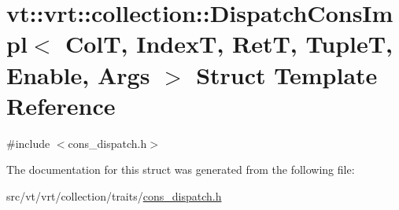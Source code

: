 \hypertarget{structvt_1_1vrt_1_1collection_1_1_dispatch_cons_impl}{}\section{vt\+:\+:vrt\+:\+:collection\+:\+:Dispatch\+Cons\+Impl$<$ ColT, IndexT, RetT, TupleT, Enable, Args $>$ Struct Template Reference}
\label{structvt_1_1vrt_1_1collection_1_1_dispatch_cons_impl}


{\ttfamily \#include $<$cons\+\_\+dispatch.\+h$>$}



The documentation for this struct was generated from the following file\+:\begin{DoxyCompactItemize}
\item 
src/vt/vrt/collection/traits/\hyperlink{cons__dispatch_8h}{cons\+\_\+dispatch.\+h}\end{DoxyCompactItemize}
